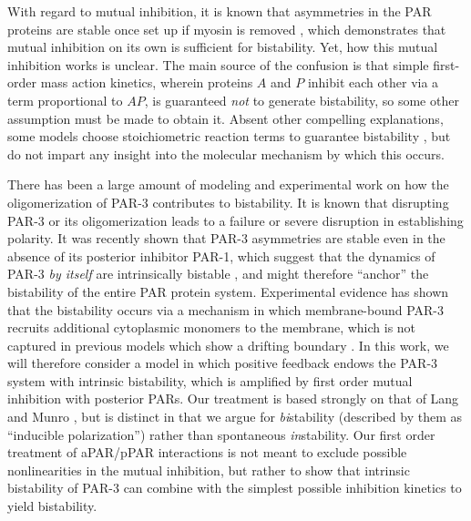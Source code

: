 \documentclass[11pt]{article}
\newcommand{\6}[1]{#1_{\text{6}}}
\newcommand{\3}[1]{#1_{\text{3}}}
\begin{document}
With regard to mutual inhibition, it is known that asymmetries in the PAR proteins are stable once set up if myosin is removed \cite{sailer2015dynamic}, which demonstrates that mutual inhibition on its own is sufficient for bistability. Yet, how this mutual inhibition works is unclear. The main source of the confusion is that simple first-order mass action kinetics, wherein proteins $A$ and $P$ inhibit each other via a term proportional to $A P$, is guaranteed \emph{not} to generate bistability, so some other assumption must be made to obtain it. Absent other compelling explanations, some models choose stoichiometric reaction terms to guarantee bistability \cite{goehring2011polarization, gross2019guiding}, but do not impart any insight into the molecular mechanism by which this occurs.

There has been a large amount of modeling and experimental work \cite{dawes20113, dickinson2017single, lang2022oligomerization, lang2023oligomerization} on how the oligomerization of PAR-3 contributes to bistability. It is known that disrupting PAR-3 \cite{etemad1995asymmetrically} or its oligomerization \cite{dickinson2017single} leads to a failure or severe disruption in establishing polarity. It was recently shown that PAR-3 asymmetries are stable even in the absence of its posterior inhibitor PAR-1, which suggest that the dynamics of PAR-3 \emph{by itself} are intrinsically bistable \cite{lang2023oligomerization}, and might therefore ``anchor'' the bistability of the entire PAR protein system. Experimental evidence has shown that the bistability occurs via a mechanism in which membrane-bound PAR-3 recruits additional cytoplasmic monomers to the membrane, which is not captured in previous models which show a drifting boundary \cite{dawes20113}. In this work, we will therefore consider a model in which positive feedback endows the PAR-3 system with intrinsic bistability, which is amplified by first order mutual inhibition with posterior PARs. Our treatment is based strongly on that of Lang and Munro \cite{lang2022oligomerization}, but is distinct in that we argue for \emph{bi}stability (described by them as ``inducible polarization'') rather than spontaneous \emph{in}stability. Our first order treatment of aPAR/pPAR interactions is not meant to exclude possible nonlinearities in the mutual inhibition, but rather to show that intrinsic bistability of PAR-3 can combine with the simplest possible inhibition kinetics to yield bistability. 
\end{document}
